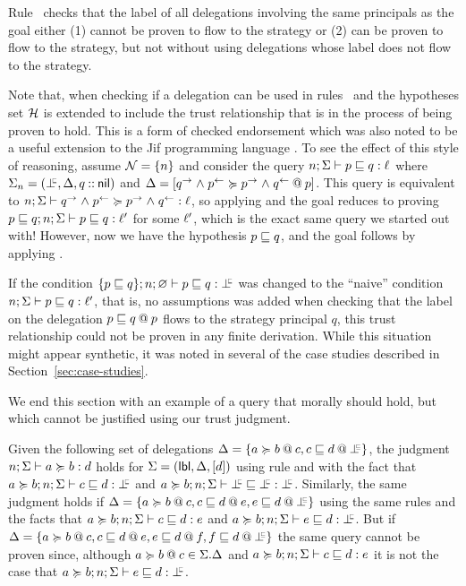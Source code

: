 Rule~ checks that the label of all delegations involving the same principals as the goal either (1) cannot be proven to flow to the strategy or (2) can be proven to flow to the strategy, but not without using delegations whose label does not flow to the strategy.

Note that, when checking if a delegation can be used in rules~ and  the hypotheses set $\Assumps$ is extended to include the trust relationship that is in the process of being proven to hold. This is a form of checked endorsement which was also noted to be a useful extension to the Jif programming language \cite{Chong:2007:SWA:1294261.1294265}.
To see the effect of this style of reasoning, assume $\Nameset = \{n\}$ and consider the query $\flowstoquery{n; \env}{p}{q}{\level}$ where $\env_n = (\botinfoflow, \scope, \cons{q}{\nil})$ and $\scope = \left[\lb{p}{\conf{q} \conj \integ{p} \actsfor \conf{p} \conj \integ{q}} \right]$. This query is equivalent to $\actsforquery{n; \env}{\conf{q} \conj \integ{p}}{\conf{p} \conj \integ{q}}{\level}$, so applying  and  the goal reduces to proving $\flowstoquery{p \flowsto q; n; \env}{p}{q}{\level'}$ for some $\level'$, which is the exact same query we started out with! However, now we have the hypothesis $p \flowsto q$, and the goal follows by applying .

If the condition $\flowstoquery{\{p \flowsto q\}; n; \emptyenv}{p}{q}{\botinfoflow}$ was changed to the ``naive'' condition $\flowstoquery{n; \env}{p}{q}{\level'}$, that is, no assumptions was added when checking that the label on the delegation $\lb{p}{p \flowsto q}$ flows to the strategy principal $q$, this trust relationship could not be proven in any finite derivation. While this situation might appear synthetic, it was noted in several of the case studies described in Section~\ref{sec:case-studies}.

We end this section with an example of a query that morally should hold, but which cannot be justified using our trust judgment.

Given the following set of delegations $\scope = \{ \lb{c}{a \actsfor b}, \lb{\botinfoflow}{c \flowsto d} \}$, the judgment $\actsforquery{n; \env}{a}{b}{d}$ holds for $\env = (\lblkw, \scope, \lbrack d \rbrack)$ using rule  and  with the fact that $\flowstoquery{a \actsfor b; n; \env}{c}{d}{\botinfoflow}$ and $\flowstoquery{a \actsfor b; n; \env}{\botinfoflow}{\botinfoflow}{\botinfoflow}$. Similarly, the same judgment holds if $\scope = \{ \lb{c}{a \actsfor b}, \lb{e}{c \flowsto d}, \lb{\botinfoflow}{e \flowsto d} \}$ using the same rules and the facts that $\flowstoquery{a \actsfor b; n; \env}{c}{d}{e}$ and $\flowstoquery{a \actsfor b; n; \env}{e}{d}{\botinfoflow}$. But if $\scope = \{ \lb{c}{a \actsfor b}, \lb{e}{c \flowsto d}, \lb{f}{e \flowsto d}, \lb{\botinfoflow}{f \flowsto d} \}$ the same query cannot be proven since, although $\lb{c}{a \actsfor b} \in \env.\scope$ and $\flowstoquery{a \actsfor b; n; \env}{c}{d}{e}$ it is not the case that $\flowstoquery{a \actsfor b; n; \env}{e}{d}{\botinfoflow}$.


